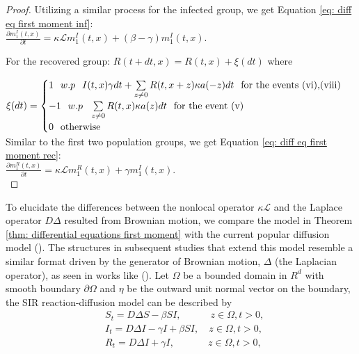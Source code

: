 \documentclass[sn-basic]{sn-jnl}%
\theoremstyle{thmstyleone}%
\theoremstyle{thmstyletwo}%
\theoremstyle{thmstylethree}%
\numberwithin{equation}{theorem}
\begin{document}
\begin{proof}
Utilizing a similar process for the infected group, we get Equation \eqref{eq: diff eq first moment inf}:\\

$\displaystyle \frac{\partial m_{1}^{I}(t,x)}{\partial t} = \kappa \mathcal{L} m_{1}^{I}(t,x) + (\beta - \gamma) m_{1}^{I}(t,x)$.

For the recovered group: $R(t+dt,x)= R(t,x) + \xi (dt)$ where

$\xi(dt)= \begin{cases}
        1 \hspace{.25cm} w.p \hspace{.25cm} I(t,x) \gamma dt + \sum\limits_{z \neq 0}R(t, x+z) \kappa a(-z) dt \hspace{.25cm} \text{for the events (vi),(viii)}\\
        -1 \hspace{.25cm} w.p \hspace{.25cm} \sum\limits_{z \neq 0}R(t, x) \kappa a(z) dt \hspace{.25cm} \text{for the event (v)}\\
        0 \hspace{.25cm} \text{otherwise}
    \end{cases}$\\
    
Similar to the first two population groups, we get Equation \eqref{eq: diff eq first moment rec}:\\

$\displaystyle \frac{\partial m_{1}^{R}(t,x)}{\partial t} = \kappa \mathcal{L} m_{1}^{R}(t,x) + \gamma m_{1}^{I}(t,x)$.\\

\end{proof}
To elucidate the differences between the nonlocal operator $\kappa\mathcal{L}$ and the Laplace operator $D\Delta$ resulted from Brownian motion, we compare the
model in Theorem \ref{thm: differential equations first moment} with the current popular diffusion model (\citep{chinviriyasit2010numerical}). The structures in subsequent studies that extend this model resemble a similar format driven by the generator of Brownian motion, $\Delta$ (the Laplacian operator), as seen in works like (\citep{caraballo2018analysis,ammi2023optimal}). Let $\Omega$ be a bounded domain in $R^d$ with smooth boundary $\partial \Omega$ and $\eta$ be the outward unit normal vector on the boundary, the SIR reaction-diffusion model can be described by
\begin{align*}
& S_t=D \Delta S-\beta S I, \quad\qquad z \in \Omega, t>0, \\
& I_t=D \Delta I-\gamma I+\beta S I, \quad z \in \Omega, t>0, \\
& R_t=D \Delta I+\gamma I, \quad\qquad \ \ z \in \Omega, t>0,
\end{align*}
\end{document}
